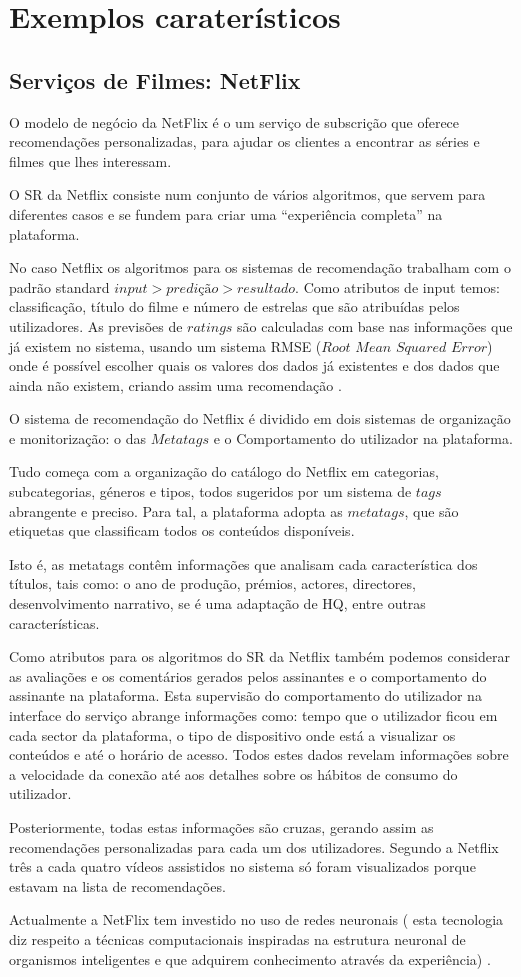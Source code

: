 \section{Exemplos caraterísticos}
\subsection{ Serviços de Filmes: NetFlix}
\par O modelo de negócio da NetFlix é o um serviço de subscrição que oferece recomendações personalizadas, para ajudar os clientes a encontrar as séries e filmes que lhes interessam.
\par O SR da Netflix consiste num conjunto de vários algoritmos, que servem para diferentes casos e se fundem para criar uma “experiência completa” na plataforma.
\par No caso Netflix os algoritmos para os sistemas de recomendação trabalham com o padrão standard $input> predição> resultado$. Como atributos de input temos: classificação, título do filme e número de estrelas que são atribuídas pelos utilizadores. As previsões de $ratings$ são calculadas com base nas informações que já existem no sistema, usando um sistema RMSE ($Root$ $Mean$ $Squared$ $Error$) onde é possível escolher quais os valores dos dados já existentes e dos dados que ainda não existem, criando assim uma recomendação \cite{ref_url1}.
\par O sistema de recomendação do Netflix é dividido em dois sistemas de organização e monitorização: o das $Metatags$ e o Comportamento do utilizador na plataforma. 
\par Tudo começa com a organização do catálogo do Netflix em categorias, subcategorias, géneros e tipos, todos sugeridos por um sistema de $tags$ abrangente e preciso. Para tal, a plataforma adopta as $metatags$, que são etiquetas que classificam todos os conteúdos disponíveis. \par Isto é, as metatags contêm informações que analisam cada característica dos títulos, tais como: o ano de produção, prémios, actores, directores, desenvolvimento narrativo, se é uma adaptação de HQ, entre outras características. 
\par Como atributos para os algoritmos do SR da Netflix também podemos considerar as avaliações e os comentários gerados pelos assinantes e o comportamento do assinante na plataforma. Esta supervisão do comportamento do utilizador na interface do serviço abrange informações como: tempo que o utilizador ficou em cada sector da plataforma, o tipo de dispositivo onde está a visualizar os conteúdos e até o horário de acesso. Todos estes dados revelam informações sobre a velocidade da conexão até aos detalhes sobre os hábitos de consumo do utilizador. \par Posteriormente, todas estas informações são cruzas, gerando assim as recomendações personalizadas para cada um dos utilizadores. Segundo a Netflix três a cada quatro vídeos assistidos no sistema só foram visualizados porque estavam na lista de recomendações. 
\par Actualmente a NetFlix tem
investido no uso de redes neuronais ( esta tecnologia diz respeito a
técnicas computacionais inspiradas na estrutura neuronal de organismos inteligentes e que adquirem conhecimento através da experiência) \cite{ref_url2}.






